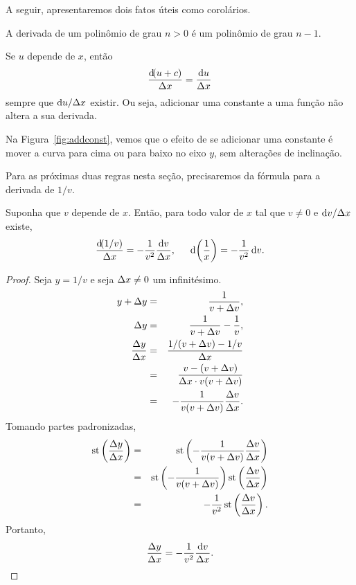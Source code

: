 A seguir, apresentaremos dois fatos úteis como corolários.

\begin{corollary}
A derivada de um polinômio de grau $n > 0$ é um polinômio de grau $n-1$.
\end{corollary}

\begin{corollary}
Se $u$ depende de $x$, então
$$
  \frac{\dif(u + c)}{\dx} = \frac{\du}{\dx}
$$
sempre que $\du/\dx$ existir. Ou seja, adicionar uma constante a uma função
não altera a sua derivada.
\end{corollary}

Na Figura~\ref{fig:addconst}, vemos que o efeito de se adicionar uma constante
é mover a curva para cima ou para baixo no eixo $y$, sem alterações de
inclinação.


Para as próximas duas regras nesta seção, precisaremos da fórmula para a
derivada de $1/v$.

\begin{lemma}\label{lem:diff1overV}
Suponha que $v$ depende de $x$. Então, para todo valor de $x$ tal que
$v \ne 0$ e $\dv/\dx$ existe,
$$
  \frac{\dif(1/v)}{\dx} = -\frac{1}{v^2} \frac{\dv}{\dx},
  \hspace{1.5em}
  \dif\left(\frac{1}{x}\right) = -\frac{1}{v^2} \dv.
$$
\end{lemma}

\begin{proof} Seja $y = 1/v$ e seja $\Delta x \ne 0$ um infinitésimo.
\begin{eqnarray*}
  y + \Delta y & = & \frac{1}{v + \Delta v}, \\
  \Delta y & = & \frac{1}{v + \Delta v} - \frac{1}{v}, \\
  \frac{\Delta y}{\Delta x} & = & \frac{1/(v + \Delta v) - 1/v}{\Delta x} \\
  & = & \frac{v - (v + \Delta v)}{\Delta x \cdot v(v + \Delta v)} \\
  & = & -\frac{1}{v(v + \Delta v)} \frac{\Delta v}{\Delta x}.
\end{eqnarray*}
Tomando partes padronizadas,
\begin{eqnarray*}
  \operatorname{st}\left(\frac{\Delta y}{\Delta x}\right) & = & \operatorname{st}\left(-\frac{1}{v(v+\Delta v)} \frac{\Delta v}{\Delta x}\right) \\
  & = & \operatorname{st}\left(-\frac{1}{v(v+\Delta v)}\right) \operatorname{st}\left(\frac{\Delta v}{\Delta x}\right) \\
  & = & -\frac{1}{v^2} \operatorname{st}\left(\frac{\Delta v}{\Delta x}\right).
\end{eqnarray*}
Portanto,
$$
  \frac{\dy}{\dx} = -\frac{1}{v^2} \frac{\dv}{\dx}.
$$
\end{proof}

